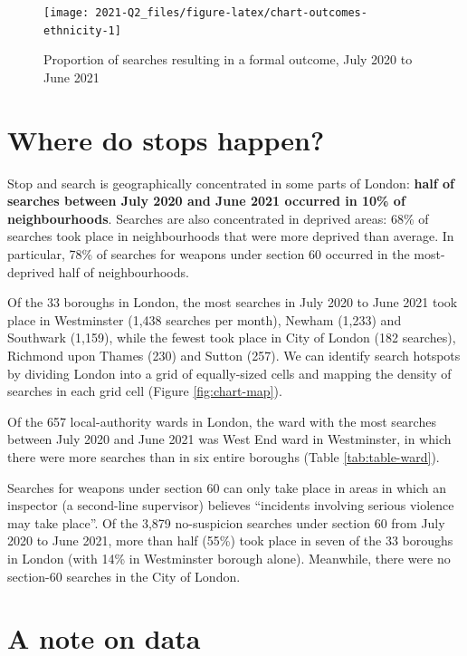 \documentclass[
  a4paper,
  twoside, 11pt]{article}
\begin{document}
\begin{figure}[tb]

{\centering \texttt{[image: 2021-Q2\_files/figure-latex/chart-outcomes-ethnicity-1]} 

}

\caption{Proportion of searches resulting in a formal outcome, July 2020 to June 2021}\label{fig:chart-outcomes-ethnicity}
\end{figure}

\hypertarget{where-do-stops-happen}{%
\section{Where do stops happen?}\label{where-do-stops-happen}}

Stop and search is geographically concentrated in some parts of London: \textbf{half of searches between July 2020 and June 2021 occurred in 10\% of neighbourhoods}. Searches are also concentrated in deprived areas: 68\% of searches took place in neighbourhoods that were more deprived than average. In particular, 78\% of searches for weapons under section 60 occurred in the most-deprived half of neighbourhoods.

Of the 33 boroughs in London, the most searches in July 2020 to June 2021 took place in Westminster (1,438 searches per month), Newham (1,233) and Southwark (1,159), while the fewest took place in City of London (182 searches), Richmond upon Thames (230) and Sutton (257). We can identify search hotspots by dividing London into a grid of equally-sized cells and mapping the density of searches in each grid cell (Figure \ref{fig:chart-map}).

Of the 657 local-authority wards in London, the ward with the most searches between July 2020 and June 2021 was West End ward in Westminster, in which there were more searches than in six entire boroughs (Table \ref{tab:table-ward}).

Searches for weapons under section 60 can only take place in areas in which an inspector (a second-line supervisor) believes ``incidents involving serious violence may take place''. Of the 3,879 no-suspicion searches under section 60 from July 2020 to June 2021, more than half (55\%) took place in seven of the 33 boroughs in London (with 14\% in Westminster borough alone). Meanwhile, there were no section-60 searches in the City of London.

\hypertarget{a-note-on-data}{%
\section{A note on data}\label{a-note-on-data}}
\end{document}
